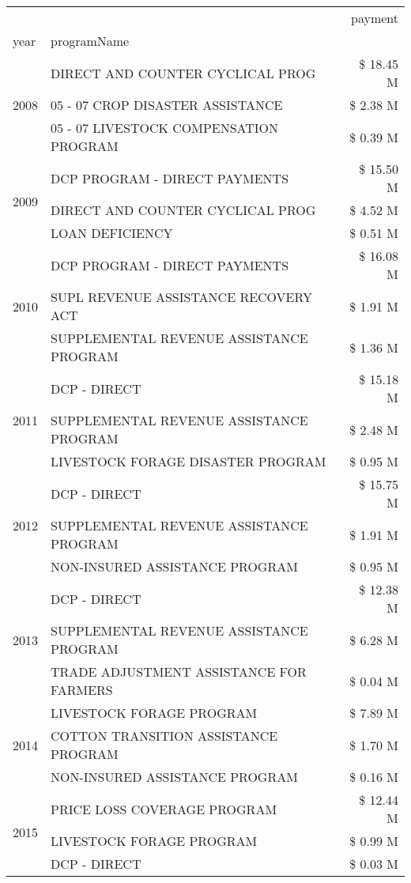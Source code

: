 \begin{tabular}{llr}
\toprule
 &  & payment \\
year & programName &  \\
\midrule
\multirow[t]{3}{*}{2008} & DIRECT AND COUNTER CYCLICAL PROG & \$ 18.45 M \\
 & 05 - 07 CROP DISASTER ASSISTANCE & \$ 2.38 M \\
 & 05 - 07 LIVESTOCK COMPENSATION PROGRAM & \$ 0.39 M \\
\cline{1-3}
\multirow[t]{3}{*}{2009} & DCP PROGRAM - DIRECT PAYMENTS & \$ 15.50 M \\
 & DIRECT AND COUNTER CYCLICAL PROG & \$ 4.52 M \\
 & LOAN DEFICIENCY & \$ 0.51 M \\
\cline{1-3}
\multirow[t]{3}{*}{2010} & DCP PROGRAM - DIRECT PAYMENTS & \$ 16.08 M \\
 & SUPL REVENUE ASSISTANCE RECOVERY ACT & \$ 1.91 M \\
 & SUPPLEMENTAL REVENUE ASSISTANCE PROGRAM & \$ 1.36 M \\
\cline{1-3}
\multirow[t]{3}{*}{2011} & DCP - DIRECT & \$ 15.18 M \\
 & SUPPLEMENTAL REVENUE ASSISTANCE PROGRAM & \$ 2.48 M \\
 & LIVESTOCK FORAGE DISASTER PROGRAM & \$ 0.95 M \\
\cline{1-3}
\multirow[t]{3}{*}{2012} & DCP - DIRECT & \$ 15.75 M \\
 & SUPPLEMENTAL REVENUE ASSISTANCE PROGRAM & \$ 1.91 M \\
 & NON-INSURED ASSISTANCE PROGRAM & \$ 0.95 M \\
\cline{1-3}
\multirow[t]{3}{*}{2013} & DCP - DIRECT & \$ 12.38 M \\
 & SUPPLEMENTAL REVENUE ASSISTANCE PROGRAM & \$ 6.28 M \\
 & TRADE ADJUSTMENT ASSISTANCE FOR FARMERS & \$ 0.04 M \\
\cline{1-3}
\multirow[t]{3}{*}{2014} & LIVESTOCK FORAGE PROGRAM & \$ 7.89 M \\
 & COTTON TRANSITION ASSISTANCE PROGRAM & \$ 1.70 M \\
 & NON-INSURED ASSISTANCE PROGRAM & \$ 0.16 M \\
\cline{1-3}
\multirow[t]{3}{*}{2015} & PRICE LOSS COVERAGE PROGRAM & \$ 12.44 M \\
 & LIVESTOCK FORAGE PROGRAM & \$ 0.99 M \\
 & DCP - DIRECT & \$ 0.03 M \\
\cline{1-3}

\end{tabular}

